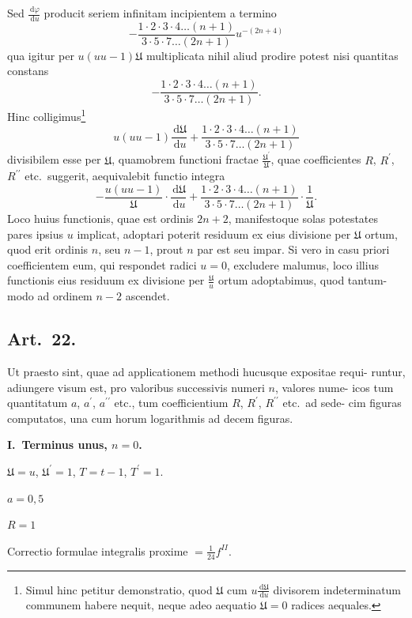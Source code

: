\documentclass[12pt,a4paper]{article}
\newcommand{\UU}{\mathfrak{U}}
\newcommand{\dd}{\,\mathrm{d}}
\begin{document}
Sed $\frac{\dd \varphi}{\dd u}$ producit seriem infinitam incipientem a termino
\[
-\frac{1 \cdot 2 \cdot 3 \cdot 4 \ldots (n+1)}{3 \cdot 5 \cdot 7 \ldots (2n+1)} u^{-(2n+4)}
\]
qua igitur per $u(uu-1)\UU$ multiplicata nihil aliud prodire potest nisi quantitas constans
\[
-\frac{1 \cdot 2 \cdot 3 \cdot 4 \ldots (n+1)}{3 \cdot 5 \cdot 7 \ldots (2n+1)}.
\]
Hinc colligimus\footnote{Simul hinc petitur demonstratio, quod $\UU$ cum $u \frac{\dd \UU}{\dd u}$ divisorem indeterminatum communem habere
nequit, neque adeo aequatio $\UU = 0$ radices aequales.}
\[
u(uu-1) \frac{\dd \UU}{\dd u} + \frac{1 \cdot 2 \cdot 3 \cdot 4 \ldots (n+1)}{3 \cdot 5 \cdot 7 \ldots (2n+1)}
\]
divisibilem esse per $\UU$, quamobrem functioni fractae $\frac{\UU^\prime}{\UU}$, quae coefficientes
$R$, $R^\prime$, $R^{\prime\prime}$ etc.\ suggerit, aequivalebit functio integra
\[
-\frac{u(uu-1)}{\UU} \cdot \frac{\dd \UU}{\dd u} + \frac{1 \cdot 2 \cdot 3 \cdot 4 \ldots (n+1)}{3 \cdot 5 \cdot 7 \ldots (2n+1)} \cdot \frac{1}{\UU}.
\]
Loco huius functionis, quae est ordinis $2n+2$, manifestoque solas potestates
pares ipsius $u$ implicat, adoptari poterit residuum ex eius divisione per $\UU$ ortum,
quod erit ordinis $n$, seu $n-1$, prout $n$ par est seu impar. Si vero in casu priori
coefficientem eum, qui respondet radici $u = 0$, excludere malumus, loco illius
functionis eius residuum ex divisione per $\frac{\UU}{u}$ ortum adoptabimus, quod tantum-
modo ad ordinem $n-2$ ascendet.

\subsection*{Art.\ 22.}

Ut praesto sint, quae ad applicationem methodi hucusque expositae requi-
runtur, adiungere visum est, pro valoribus successivis numeri $n$, valores nume-
icos tum quantitatum $a$, $a^\prime$, $a^{\prime\prime}$ etc., tum coefficientium $R$, $R^\prime$, $R^{\prime\prime}$ etc.\ ad sede-
cim figuras computatos, una cum horum logarithmis ad decem figuras.

\medskip

\textbf{I.\ Terminus unus, $n = 0$.}

\medskip

$\UU = u$, \quad $\UU^\prime = 1$, \quad $T = t - 1$, \quad $T^\prime = 1$.

$a = 0{,}5$

$R = 1$

Correctio formulae integralis proxime $= \tfrac{1}{24} f^{II}$.
\end{document}
